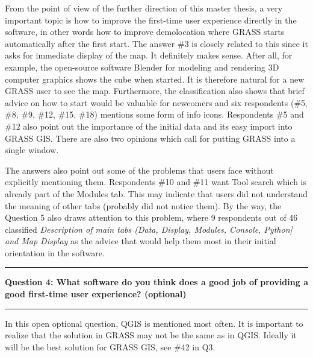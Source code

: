 \documentclass[a4paper,10pt,twoside]{article}
\begin{document}
From the point of view of the further direction of this master thesis, a very important topic is how to improve the first-time user experience directly in the software, in other words how to improve demolocation where GRASS starts automatically after the first start. The answer \#3 is closely related to this since it asks for immediate display of the map. It definitely makes sense. After all, for example, the open-source software Blender for modeling and rendering 3D computer graphics shows the cube when started. It is therefore natural for a new GRASS user to see the map. Furthermore, the classification also shows that brief advice on how to start would be valuable for newcomers and six respondents (\#5, \#8, \#9, \#12, \#15, \#18) mentions some form of info icons. Respondents \#5 and \#12 also point out the importance of the initial data and its easy import into GRASS GIS. There are also two opinions which call for putting GRASS into a single window.

The answers also point out some of the problems that users face without explicitly mentioning them. Respondents \#10 and \#11 want Tool search which is already part of the Modules tab. This may indicate that users did not understand the meaning of other tabs (probably did not notice them). By the way, the Question 5 also draws attention to this problem, where 9 respondents out of 46 classified \textit{Description of main tabs (Data, Display, Modules, Console, Python] and Map Display} as the advice that would help them most in their initial orientation in the software.

\par\noindent\rule{\textwidth}{0.4pt}
\noindent \textbf{Question 4: What software do you think does a good job of providing a good first-time user experience? (optional)}
\par\noindent\rule{\textwidth}{0.4pt}
\noindent In this open optional question, QGIS is mentioned most often. It is important to realize that the solution in GRASS may not be the same as in QGIS. Ideally it will be the best solution for GRASS GIS, see \#42 in Q3.
\end{document}
